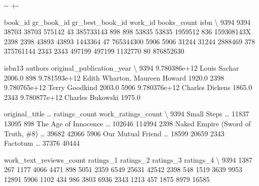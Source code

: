 \documentclass[letterpaper,10pt,english]{sphinxmanual}
\newlength\nbsphinxcodecellspacing
\begin{document}
{

\kern-\sphinxverbatimsmallskipamount\kern-\baselineskip
\kern+\FrameHeightAdjust\kern-\fboxrule
\vspace{\nbsphinxcodecellspacing}

\begin{sphinxVerbatim}[commandchars=\\\{\}]
\llap{\color{nbsphinxout}[9]:\,\hspace{\fboxrule}\hspace{\fboxsep}}      book\_id  gr\_book\_id  gr\_best\_book\_id  work\_id  books\_count        isbn  \textbackslash{}
9394     9394       38703            38703   575142           43   385733143
898       898       53835            53835  1959512          836  159308143X
2398     2398       43893            43893  1443364           47   765344300
5906     5906       31244            31244  2888469          378   375761144
2343     2343      497199           497199  1132770           80   876852630

            isbn13                        authors  original\_publication\_year  \textbackslash{}
9394  9.780386e+12                   Louis Sachar                     2006.0
898   9.781593e+12  Edith Wharton, Maureen Howard                     1920.0
2398  9.780765e+12                 Terry Goodkind                     2003.0
5906  9.780376e+12                Charles Dickens                     1865.0
2343  9.780877e+12               Charles Bukowski                     1975.0

                         original\_title  {\ldots} ratings\_count work\_ratings\_count  \textbackslash{}
9394                        Small Steps  {\ldots}         11837              13095
898                The Age of Innocence  {\ldots}        102646             114994
2398  Naked Empire (Sword of Truth, \#8)  {\ldots}         39682              42066
5906                  Our Mutual Friend  {\ldots}         18599              20659
2343                           Factotum  {\ldots}         37376              40444

      work\_text\_reviews\_count  ratings\_1  ratings\_2  ratings\_3  ratings\_4  \textbackslash{}
9394                     1387        267       1177       4066       4471
898                      5051       2359       6549      25631      42542
2398                      548       1519       3639       9953      12891
5906                     1102        434        986       3803       6936
2343                     1213        457       1875       8979      16585


\end{sphinxVerbatim}}
\end{document}
